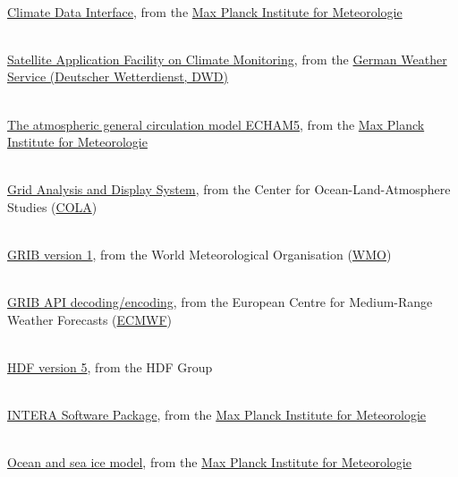 \begin{thebibliography}{xx}


 \ \\
  \href{https://code.zmaw.de/projects/cdi}
       {Climate Data Interface},
  from the
  \href{http://www.mpimet.mpg.de}
       {Max Planck Institute for Meteorologie}


 \ \\
  \href{http://www.cmsaf.eu}
       {Satellite Application Facility on Climate Monitoring},
  from the
  \href{http://www.dwd.de}
       {German Weather Service (Deutscher Wetterdienst, DWD)}


 \ \\
  \href{http://www.mpimet.mpg.de/wissenschaft/publikationen/reports.html}
       {The atmospheric general circulation model ECHAM5},
  from the
  \href{http://www.mpimet.mpg.de}
       {Max Planck Institute for Meteorologie}


 \ \\
  \href{http://www.iges.org/grads/}
       {Grid Analysis and Display System},
  from the Center for Ocean-Land-Atmosphere Studies
  (\href{http://www.iges.org/cola.html}{COLA})


 \ \\
  \href{http://www.wmo.ch/web/www/WMOCodes/Guides/GRIB/GRIB1-Contents.html}
       {GRIB version 1},
  from the World Meteorological Organisation
  (\href{http://www.wmo.ch}{WMO})


 \ \\
  \href{https://software.ecmwf.int/wiki/display/GRIB/Home}
       {GRIB API decoding/encoding},
  from the European Centre for Medium-Range Weather Forecasts
  (\href{http://www.ecmwf.int}{ECMWF})


 \ \\
  \href{https://www.hdfgroup.org/HDF5}
       {HDF version 5},
  from the HDF Group


 \ \\
  \href{http://wekuw.met.fu-berlin.de/~IngoKirchner/nudging/nudging}{INTERA Software Package},
  from the
  \href{http://www.mpimet.mpg.de}
       {Max Planck Institute for Meteorologie}


 \ \\
  \href{http://www.mpimet.mpg.de/en/wissenschaft/modelle/mpiom/mpiom-description.html}
       {Ocean and sea ice model},
  from the
  \href{http://www.mpimet.mpg.de}
       {Max Planck Institute for Meteorologie}



\end{thebibliography}

